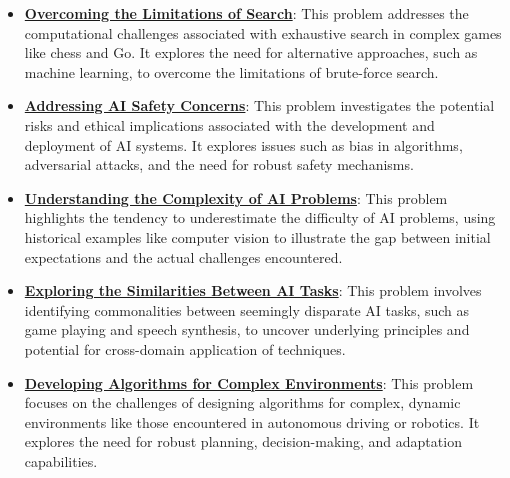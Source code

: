 \documentclass{article}%
\begin{document}
\begin{itemize}[leftmargin=*]
\item \href{https://purdue.brightspace.com/d2l/common/assets/pdfjs-d2l-dist/1.0.14-legacy/web/viewer.html?file=\%2Fcontent\%2Fenforced\%2F1095467-wl.202510.CS.24300.001\%2F02L2-Intro.pdf\%3Fou\%3D1095467\&lang=en-us\&container=d2l-fileviewer-rendered-pdf\&fullscreen=d2l-fileviewer-rendered-pdf-dialog\&height=667#page=11}{\textbf{Overcoming the Limitations of Search}}: This problem addresses the computational challenges associated with exhaustive search in complex games like chess and Go. It explores the need for alternative approaches, such as machine learning, to overcome the limitations of brute-force search.%
\item \href{https://purdue.brightspace.com/d2l/common/assets/pdfjs-d2l-dist/1.0.14-legacy/web/viewer.html?file=\%2Fcontent\%2Fenforced\%2F1095467-wl.202510.CS.24300.001\%2F02L2-Intro.pdf\%3Fou\%3D1095467\&lang=en-us\&container=d2l-fileviewer-rendered-pdf\&fullscreen=d2l-fileviewer-rendered-pdf-dialog\&height=667#page=19}{\textbf{Addressing AI Safety Concerns}}: This problem investigates the potential risks and ethical implications associated with the development and deployment of AI systems. It explores issues such as bias in algorithms, adversarial attacks, and the need for robust safety mechanisms.%
\item \href{https://purdue.brightspace.com/d2l/common/assets/pdfjs-d2l-dist/1.0.14-legacy/web/viewer.html?file=\%2Fcontent\%2Fenforced\%2F1095467-wl.202510.CS.24300.001\%2F02L2-Intro.pdf\%3Fou\%3D1095467\&lang=en-us\&container=d2l-fileviewer-rendered-pdf\&fullscreen=d2l-fileviewer-rendered-pdf-dialog\&height=667#page=15}{\textbf{Understanding the Complexity of AI Problems}}: This problem highlights the tendency to underestimate the difficulty of AI problems, using historical examples like computer vision to illustrate the gap between initial expectations and the actual challenges encountered.%
\item \href{https://purdue.brightspace.com/d2l/common/assets/pdfjs-d2l-dist/1.0.14-legacy/web/viewer.html?file=\%2Fcontent\%2Fenforced\%2F1095467-wl.202510.CS.24300.001\%2F02L2-Intro.pdf\%3Fou\%3D1095467\&lang=en-us\&container=d2l-fileviewer-rendered-pdf\&fullscreen=d2l-fileviewer-rendered-pdf-dialog\&height=667#page=31}{\textbf{Exploring the Similarities Between AI Tasks}}: This problem involves identifying commonalities between seemingly disparate AI tasks, such as game playing and speech synthesis, to uncover underlying principles and potential for cross-domain application of techniques.%
\item \href{https://purdue.brightspace.com/d2l/common/assets/pdfjs-d2l-dist/1.0.14-legacy/web/viewer.html?file=\%2Fcontent\%2Fenforced\%2F1095467-wl.202510.CS.24300.001\%2F02L2-Intro.pdf\%3Fou\%3D1095467\&lang=en-us\&container=d2l-fileviewer-rendered-pdf\&fullscreen=d2l-fileviewer-rendered-pdf-dialog\&height=667#page=27}{\textbf{Developing Algorithms for Complex Environments}}: This problem focuses on the challenges of designing algorithms for complex, dynamic environments like those encountered in autonomous driving or robotics. It explores the need for robust planning, decision-making, and adaptation capabilities.%
\end{itemize}%
\end{document}
